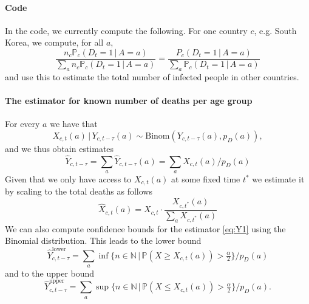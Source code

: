 \documentclass[a4paper]{article}
\newcommand\N{\mathbb{N}}
\renewcommand\P{\mathbb{P}}
\newcommand{\given}{\, \vert \,}
\begin{document}
\paragraph{Code}
In the code, we currently compute the following. 
For one country $c$, e.g. South Korea, we compute, for all $a$,
$$
\frac{n_c \P_c(D_t = 1\,|\,A = a)}
{\sum_a n_c \P_c(D_t = 1\,|\,A = a)}
=
\frac{P_c(D_t = 1\,|\,A = a)}
{\sum_a \P_c(D_t = 1\,|\,A = a)}
$$
and use this to estimate the total number 
of infected people in other countries.




\paragraph{The estimator for known number of deaths per age group}
%
For every $a$ we have that 
$$X_{c,t}(a) \given Y_{c,t-\tau}(a) \sim \text{Binom}(Y_{c,t-\tau}(a), p_D(a)),$$
and we thus obtain estimates
\begin{equation}
  \label{eq:Y1}
  \hat{Y}_{c,t-\tau} = \sum_a \hat{Y}_{c,t-\tau}(a) =\sum_a
  X_{c,t}(a) / p_D(a)
\end{equation}
Given that we only have access to $X_{c,t}(a)$ at some fixed time
$t^*$ we estimate it by scaling to the total deaths as follows
\begin{equation*}
  \hat{X}_{c,t}(a)=X_{c,t}\cdot\frac{X_{c,t^*}(a)}{\sum_a X_{c,t^*}(a)}
\end{equation*}
We can also compute confidence bounds for the estimator \eqref{eq:Y1}
using the Binomial distribution. This leads to the lower bound
\begin{equation*}
  \hat{Y}_{c,t-\tau}^{\text{lower}} = \sum_a \inf\{n\in\N \,\vert\, \P(X\geq
  X_{c,t}(a))>\tfrac{\alpha}{2}\} / p_D(a)
\end{equation*}
and to the upper bound
\begin{equation*}
  \hat{Y}_{c,t-\tau}^{\text{upper}} = \sum_a \sup\{n\in\N \,\vert\, \P(X\leq
  X_{c,t}(a))>\tfrac{\alpha}{2}\} / p_D(a).
\end{equation*}
\end{document}
